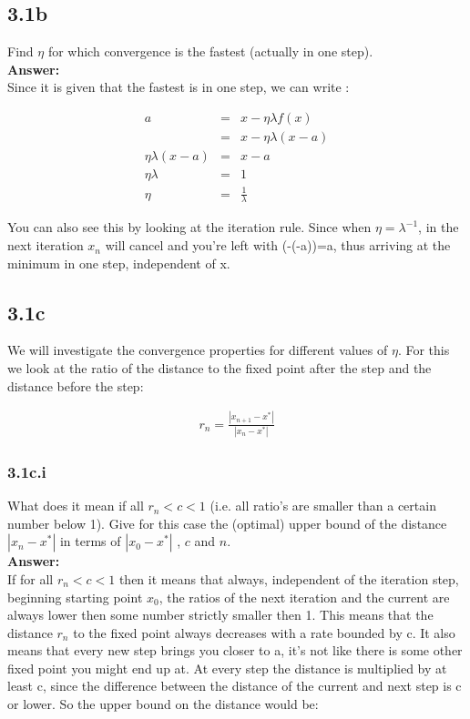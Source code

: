 \documentclass[a4paper]{article}
\begin{document}
\subsection*{3.1b}

Find $\eta$ for which convergence is the fastest (actually in one step).\\

\textbf{Answer:}\\

Since it is given that the fastest is in one step, we can write :

\begin{eqnarray}
a &=& x - \eta \lambda f(x)\\
&=& x - \eta \lambda (x-a)\\
\eta \lambda (x-a) &=& x - a\\
\eta \lambda &=& 1\\
\eta &=& \frac{1}{\lambda}
\end{eqnarray}

You can also see this by looking at the iteration rule. Since when $\eta = \lambda^{-1}$, in the next iteration $x_n$ will cancel and you're left with (-(-a))=a, thus arriving at the minimum in one step, independent of x. 

\subsection*{3.1c}

We will investigate the convergence properties for different values of $\eta$. For this we look at the ratio of the distance to the fixed point after the step and the distance before the step:
 
\begin{eqnarray}
r_n = \frac{|x_{n+1} - x^*|}{|x_n - x^*|}
\end{eqnarray}

\subsubsection*{3.1c.i}

What does it mean if all $r_n < c < 1$ (i.e. all ratio’s are smaller than a certain number below 1). Give for this case the (optimal) upper bound of the distance $|x_n - x^*|$ in terms of $|x_0 - x^*|$ , $c$ and $n$.\\

\textbf{Answer:}\\

If for all $r_n < c < 1$ then it means that always, independent of the iteration step, beginning starting point $x_0$, the ratios of the next iteration and the current are always lower then some number strictly smaller then 1. This means that the distance $r_n$ to the fixed point always decreases with a rate bounded by c. It also means that every new step brings you closer to a, it's not like there is some other fixed point you might end up at.
\newpage 
At every step the distance is multiplied by at least c, since the difference between the distance of the current and next step is c or lower. So the upper bound on the distance would be:
\end{document}
